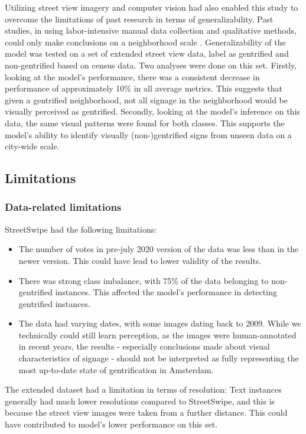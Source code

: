 Utilizing street view imagery and computer vision had also enabled this study to overcome the limitations of past research in terms of generalizability. Past studies, in using labor-intensive manual data collection and qualitative methods, could only make conclusions on a neighborhood scale \cite{reades_understanding_2019, barton_exploration_2016}. Generalizability of the model was tested on a set of extended street view data, label as gentrified and non-gentrified based on census data. Two analyses were done on this set. Firstly, looking at the model's performance, there was a consistent decrease in performance of approximately 10\% in all average metrics. This suggests that given a gentrified neighborhood, not all signage in the neighborhood would be visually perceived as gentrified. Secondly, looking at the model's inference on this data, the same visual patterns were found for both classes. This supports the model's ability to identify visually (non-)gentrified signs from unseen data on a city-wide scale.

\subsection{Limitations}
\subsubsection{Data-related limitations}

StreetSwipe had the following limitations: 
\begin{itemize}
    \item The number of votes in pre-july 2020 version of the data was less than in the newer version. This could have lead to lower validity of the results.
    \item There was strong class imbalance, with 75\% of the data belonging to non-gentrified instances. This affected the model's performance in detecting gentrified instances.
    \item The data had varying dates, with some images dating back to 2009. While we technically could still learn perception, as the images were human-annotated in recent years, the results - especially conclusions made about visual characteristics of signage - should not be interpreted as fully representing the most up-to-date state of gentrification in Amsterdam.
\end{itemize}

The extended dataset had a limitation in terms of resolution: Text instances generally had much lower resolutions compared to StreetSwipe, and this is because the street view images were taken from a further distance. This could have contributed to model's lower performance on this set.

